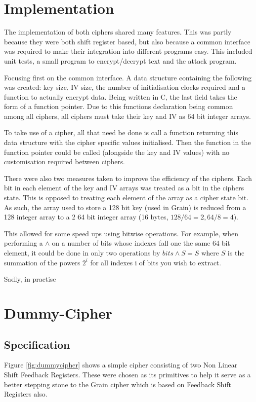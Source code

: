 \documentclass{report}
\let\Oldsection\section
\renewcommand{\section}{\FloatBarrier\Oldsection}
\let\Oldsubsection\subsection
\renewcommand{\subsection}{\FloatBarrier\Oldsubsection}
\begin{document}
\section{Implementation}
The implementation of both ciphers shared many features. This was partly because they were both shift register based, but also because a common interface was required to make their integration into different programs easy. This included unit tests, a small program to encrypt/decrypt text and the attack program.

Focusing first on the common interface. A data structure containing the following was created: key size, IV size, the number of initialisation clocks required and a function to actually encrypt data. Being written in C, the last field takes the form of a function pointer. Due to this functions declaration being common among all ciphers, all ciphers must take their key and IV as 64 bit integer arrays.

To take use of a cipher, all that need be done is call a function returning this data structure with the cipher specific values initialised. Then the function in the function pointer could be called (alongside the key and IV values) with no customisation required between ciphers.

There were also two measures taken to improve the efficiency of the ciphers. Each bit in each element of the key and IV arrays was treated as a bit in the ciphers state. This is opposed to treating each element of the array as a cipher state bit. As such, the array used to store a 128 bit key (used in Grain) is reduced from a 128 integer array to a 2 64 bit integer array (16 bytes, $128/64 = 2, 64/8=4$).

This allowed for some speed ups using bitwise operations. For example, when performing a $\land$ on a number of bits whose indexes fall one the same 64 bit element, it could be done in only two operations by $bits \land S = S$ where $S$ is the summation of the powers $2^i$ for all indexes i of bits you wish to extract.

Sadly, in practise %

\section{Dummy-Cipher}
\subsection{Specification}
Figure \ref{fig:dummycipher} shows a simple cipher consisting of two Non Linear Shift Feedback Registers. These were chosen as its primitives to help it serve as a better stepping stone to the Grain cipher which is based on Feedback Shift Registers also.
\end{document}
